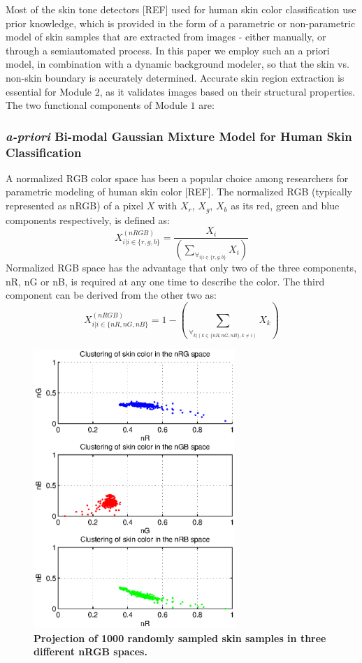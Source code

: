 \documentclass[times, 10pt,twocolumn]{article}
\begin{document}
Most of the skin tone detectors [REF] used for human skin color
classification use prior knowledge, which is provided in the form of a
parametric or non-parametric model of skin samples that are
extracted from images - either manually, or through a semiautomated process. In this paper
we employ such an a priori model, in combination with a dynamic
background modeler, so that the skin vs. non-skin boundary is
accurately determined. Accurate skin region extraction is essential
for Module $2$, as it validates images based on their
structural properties. The two functional components of Module $1$
are:

\subsubsection{{\em a-priori} Bi-modal Gaussian Mixture Model
for Human Skin Classification}\label{Bi-ModGaussian} A normalized RGB
color space has been a popular choice among researchers for
parametric modeling of human skin color [REF]. The normalized RGB
(typically represented as nRGB) of a pixel $X$ with $X_r$, $X_g$,
$X_b$ as its red, green and blue components respectively, is defined
as:
\begin{equation}
X_{i|i \in \{r,g,b\}}^{(nRGB)} =
\frac{X_i}{\left(\sum\limits_{\forall_{i|i\in\{r,g,b\}}}X_i\right)}
\end{equation}
Normalized RGB space has the advantage that only two of the three
components, nR, nG or nB, is required at any one time to describe
the color. The third component can be derived from the other two as:
\begin{equation}
X_{i|i \in \{nR,nG,nB\}}^{(nRGB)} =  1 -\left(
\sum_{\forall_{k|(k\in\{nR,nG,nB\}, k \ne i)}}X_k \right)
\end{equation}
\vspace{-0.15in}
\begin{figure}[h]
\centering
\includegraphics[width=3in]{Figure3.eps}
\caption{{\bf {\selectfont Projection of 1000
randomly sampled skin samples in three different nRGB spaces.\\}}}
\label{Fig:nRGBProject}
\end{figure}
\end{document}
